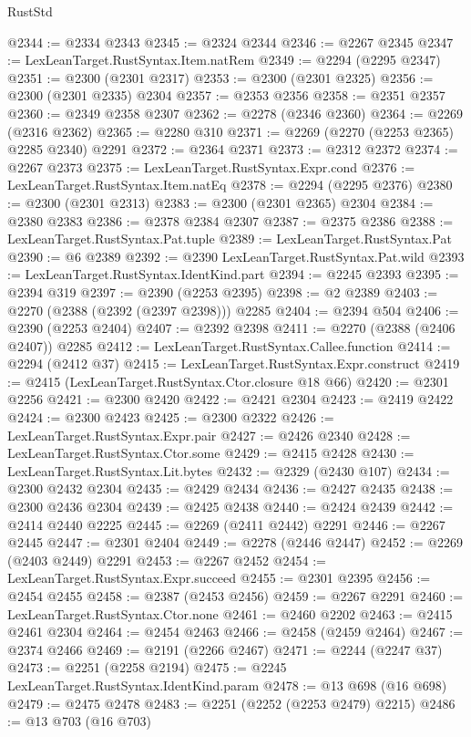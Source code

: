 \begin{lexlean}{RustStd}
\begin{coremodule}
@2344 := @2334 @2343
@2345 := @2324 @2344
@2346 := @2267 @2345
@2347 := LexLeanTarget.RustSyntax.Item.natRem
@2349 := @2294 (@2295 @2347)
@2351 := @2300 (@2301 @2317)
@2353 := @2300 (@2301 @2325)
@2356 := @2300 (@2301 @2335) @2304
@2357 := @2353 @2356
@2358 := @2351 @2357
@2360 := @2349 @2358 @2307
@2362 := @2278 (@2346 @2360)
@2364 := @2269 (@2316 @2362)
@2365 := @2280 @310
@2371 := @2269 (@2270 (@2253 @2365) @2285 @2340) @2291
@2372 := @2364 @2371
@2373 := @2312 @2372
@2374 := @2267 @2373
@2375 := LexLeanTarget.RustSyntax.Expr.cond
@2376 := LexLeanTarget.RustSyntax.Item.natEq
@2378 := @2294 (@2295 @2376)
@2380 := @2300 (@2301 @2313)
@2383 := @2300 (@2301 @2365) @2304
@2384 := @2380 @2383
@2386 := @2378 @2384 @2307
@2387 := @2375 @2386
@2388 := LexLeanTarget.RustSyntax.Pat.tuple
@2389 := LexLeanTarget.RustSyntax.Pat
@2390 := @6 @2389
@2392 := @2390 LexLeanTarget.RustSyntax.Pat.wild
@2393 := LexLeanTarget.RustSyntax.IdentKind.part
@2394 := @2245 @2393
@2395 := @2394 @319
@2397 := @2390 (@2253 @2395)
@2398 := @2 @2389
@2403 := @2270 (@2388 (@2392 (@2397 @2398))) @2285
@2404 := @2394 @504
@2406 := @2390 (@2253 @2404)
@2407 := @2392 @2398
@2411 := @2270 (@2388 (@2406 @2407)) @2285
@2412 := LexLeanTarget.RustSyntax.Callee.function
@2414 := @2294 (@2412 @37)
@2415 := LexLeanTarget.RustSyntax.Expr.construct
@2419 := @2415 (LexLeanTarget.RustSyntax.Ctor.closure @18 @66)
@2420 := @2301 @2256
@2421 := @2300 @2420
@2422 := @2421 @2304
@2423 := @2419 @2422
@2424 := @2300 @2423
@2425 := @2300 @2322
@2426 := LexLeanTarget.RustSyntax.Expr.pair
@2427 := @2426 @2340
@2428 := LexLeanTarget.RustSyntax.Ctor.some
@2429 := @2415 @2428
@2430 := LexLeanTarget.RustSyntax.Lit.bytes
@2432 := @2329 (@2430 @107)
@2434 := @2300 @2432 @2304
@2435 := @2429 @2434
@2436 := @2427 @2435
@2438 := @2300 @2436 @2304
@2439 := @2425 @2438
@2440 := @2424 @2439
@2442 := @2414 @2440 @2225
@2445 := @2269 (@2411 @2442) @2291
@2446 := @2267 @2445
@2447 := @2301 @2404
@2449 := @2278 (@2446 @2447)
@2452 := @2269 (@2403 @2449) @2291
@2453 := @2267 @2452
@2454 := LexLeanTarget.RustSyntax.Expr.succeed
@2455 := @2301 @2395
@2456 := @2454 @2455
@2458 := @2387 (@2453 @2456)
@2459 := @2267 @2291
@2460 := LexLeanTarget.RustSyntax.Ctor.none
@2461 := @2460 @2202
@2463 := @2415 @2461 @2304
@2464 := @2454 @2463
@2466 := @2458 (@2459 @2464)
@2467 := @2374 @2466
@2469 := @2191 (@2266 @2467)
@2471 := @2244 (@2247 @37)
@2473 := @2251 (@2258 @2194)
@2475 := @2245 LexLeanTarget.RustSyntax.IdentKind.param
@2478 := @13 @698 (@16 @698)
@2479 := @2475 @2478
@2483 := @2251 (@2252 (@2253 @2479) @2215)
@2486 := @13 @703 (@16 @703)

\end{coremodule}
\end{lexlean}
